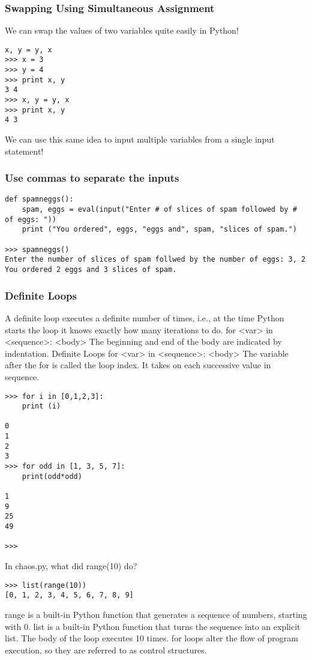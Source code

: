 \documentclass[12pt,a4paper,final,twoside,onecolumn,titlepage]{book}
\begin{document}
\subsubsection{Swapping Using Simultaneous Assignment}
We can swap the values of two variables quite easily in Python!
\lstset{language=Python, tabsize=4}
\begin{lstlisting}
x, y = y, x
>>> x = 3
>>> y = 4
>>> print x, y
3 4
>>> x, y = y, x
>>> print x, y
4 3
\end{lstlisting}
We can use this same idea to input multiple variables from a single input statement!
\subsubsection{Use commas to separate the inputs}
\lstset{language=Python, tabsize=4}
\begin{lstlisting}
def spamneggs():
	spam, eggs = eval(input("Enter # of slices of spam followed by # of eggs: "))
	print ("You ordered", eggs, "eggs and", spam, "slices of spam.")
	
>>> spamneggs()
Enter the number of slices of spam follwed by the number of eggs: 3, 2
You ordered 2 eggs and 3 slices of spam.
\end{lstlisting}

\subsubsection{Definite Loops}
A definite loop executes a definite number of times, i.e., at the time Python starts the loop it knows exactly how many iterations to do.
for <var> in <sequence>:
	<body>
The beginning and end of the body are indicated by indentation.
Definite Loops
for <var> in <sequence>:
<body>
The variable after the for is called the loop index. It takes on each successive value in sequence.
\lstset{language=Python, tabsize=4}
\begin{lstlisting}
>>> for i in [0,1,2,3]:
	print (i)

0
1
2
3
>>> for odd in [1, 3, 5, 7]:
	print(odd*odd)

1
9
25
49

>>> 
\end{lstlisting}
In chaos.py, what did range(10) do?
\lstset{language=Python, tabsize=4}
\begin{lstlisting}
>>> list(range(10))
[0, 1, 2, 3, 4, 5, 6, 7, 8, 9]
\end{lstlisting}
range is a built-in Python function that generates a sequence of numbers, starting with 0. list is a built-in Python function that turns the sequence into an explicit list. The body of the loop executes 10 times. for loops alter the flow of program execution, so they are referred to as control structures.
\end{document}
